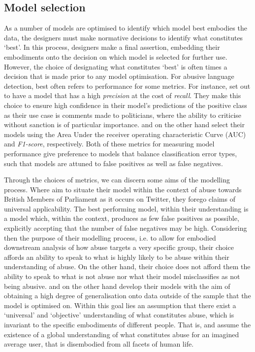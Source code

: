 {\subsection{Model selection}
As a number of models are optimised to identify which model best embodies the data, the designers must make normative decisions to identify what constitutes `best'.
In this process, designers make a final assertion, embedding their embodiments onto the decision on which model is selected for further use.
However, the choice of designating what constitutes `best' is often times a decision that is made prior to any model optimisation.
For abusive language detection, best often refers to performance for some metrics.
For instance, \citet{Gorrell:2018} set out to have a model that has a high \textit{precision} at the cost of \textit{recall}.
They make this choice to ensure high confidence in their model's predictions of the positive class as their use case is comments made to politicians, where the ability to criticise without sanction is of particular importance.
\citet{Wulczyn:2016} and \citet{Kshirsagar:2018} on the other hand select their models using the Area Under the receiver operating characteristic Curve (AUC) and \textit{F1-score}, respectively.
Both of these metrics for measuring model performance give preference to models that balance classification error types, such that models are attuned to false positives as well as false negatives.

Through the choices of metrics, we can discern some aims of the modelling process.
Where \citet{Gorrell:2018} aim to situate their model within the context of abuse towards British Members of Parliament as it occurs on Twitter, they forego claims of universal applicability.
The best performing model, within their understanding is a model which, within the context, produces as few false positives as possible, explicitly accepting that the number of false negatives may be high.
Considering then the purpose of their modelling process, i.e. to allow for embodied downstream analysis of how abuse targets a very specific group, their choice affords an ability to speak to what is highly likely to be abuse within their understanding of abuse.
On the other hand, their choice does not afford them the ability to speak to what is not abuse nor what their model misclassifies as not being abusive.
\citet{Wulczyn:2016} and \citet{Kshirsagar:2018} on the other hand develop their models with the aim of obtaining a high degree of generalisation onto data outside of the sample that the model is optimised on.
Within this goal lies an assumption that there exist a `universal' and  `objective' understanding of what constitutes abuse, which is invariant to the specific embodiments of different people.
That is, \citet{Wulczyn:2016} and \citet{Kshirsagar:2018} assume the existence of a global understanding of what constitutes abuse for an imagined average user, that is disembodied from all facets of human life.

}
